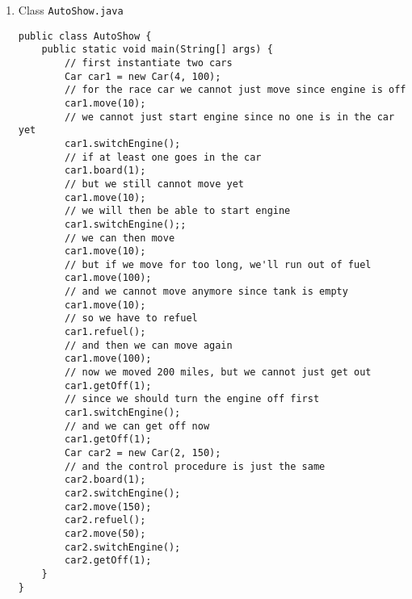 \documentclass[12pt,letterpaper,twoside]{article}
\begin{document}
\begin{enumerate}[label=(\alph*)]
\item Class \texttt{AutoShow.java}
\lstset{language=java, tabsize=2}
\begin{lstlisting}
public class AutoShow {
	public static void main(String[] args) {
		// first instantiate two cars
		Car car1 = new Car(4, 100);
		// for the race car we cannot just move since engine is off
		car1.move(10);
		// we cannot just start engine since no one is in the car yet
		car1.switchEngine();
		// if at least one goes in the car
		car1.board(1);
		// but we still cannot move yet
		car1.move(10);
		// we will then be able to start engine
		car1.switchEngine();;
		// we can then move
		car1.move(10);
		// but if we move for too long, we'll run out of fuel
		car1.move(100);
		// and we cannot move anymore since tank is empty
		car1.move(10);
		// so we have to refuel
		car1.refuel();
		// and then we can move again
		car1.move(100);
		// now we moved 200 miles, but we cannot just get out
		car1.getOff(1);
		// since we should turn the engine off first
		car1.switchEngine();
		// and we can get off now
		car1.getOff(1);
		Car car2 = new Car(2, 150);
		// and the control procedure is just the same
		car2.board(1);
		car2.switchEngine();
		car2.move(150);
		car2.refuel();
		car2.move(50);
		car2.switchEngine();
		car2.getOff(1);
	}
}
\end{lstlisting}

\end{enumerate}
\end{document}
